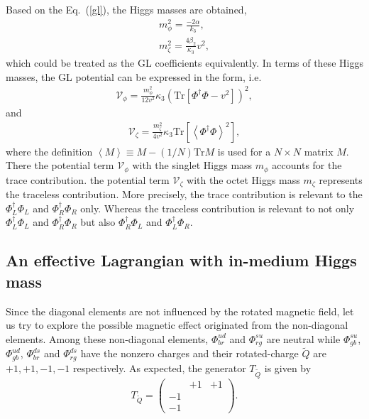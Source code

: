 \documentclass[prd, showpacs,nofootinbib,amsmath,amssymb]{revtex4}
\begin{document}
Based on the Eq.~(\ref{gl}), the Higgs
masses are obtained,
\begin{eqnarray}
m_\phi^2=\frac{-2\alpha}{k_3},\\ m_\zeta^2=\frac{4\beta_2}{\kappa_3}
	v^2,\label{mhiggs}
\end{eqnarray}
which could be treated as the GL coefficients equivalently. In terms of these Higgs masses, the GL
potential can be expressed in the form, i.e.
\begin{eqnarray}
\mathcal{V}_\phi=
\frac{m_\phi^2}{12v^2}\kappa_3(\text{Tr}[\Phi^\dagger\Phi-v^2])^2,
\label{glmphi}
\end{eqnarray}
and
\begin{eqnarray}
\mathcal{V}_\zeta=
\frac{m_\zeta^2}{4v^2}\kappa_3\text{Tr}\left[\left<\Phi^\dagger\Phi\right>^2\right],
\label{glzeta}
\end{eqnarray}
where the definition $\left<M\right>\equiv M-(1/N)\text{Tr}M$ is used for a $N\times N$ matrix $M$.
There the potential term $\mathcal{V}_\phi$ with the singlet Higgs mass $m_{\phi}$ accounts for the trace contribution.
the potential term $\mathcal{V}_\zeta$ with the octet Higgs mass $m_{\zeta}$ represents the traceless contribution.
More precisely, the trace contribution is relevant to the $\Phi_L^\dagger\Phi_L$ and $\Phi_R^\dagger\Phi_R$ only.
Whereas the traceless contribution is relevant to not only $\Phi_L^\dagger\Phi_L$ and $\Phi_R^\dagger\Phi_R$ 
but also $\Phi_R^\dagger\Phi_L$ and $\Phi_L^\dagger\Phi_R$.








\subsection{An effective Lagrangian with in-medium Higgs mass}
\label{sssec:2}

Since the diagonal elements are not influenced by the rotated magnetic field,
let us try to explore the possible magnetic effect originated from the non-diagonal elements.
Among these non-diagonal
elements, $\Phi_{br}^{ud}$ and $\Phi_{rg}^{su}$ are neutral while $\Phi_{gb}^{su}$, $\Phi_{gb}^{ud}$, $\Phi_{br}^{ds}$ and $\Phi_{rg}^{ds}$ have the
nonzero charges and their  rotated-charge $\widetilde{Q}$ are $+1,+1,-1,-1$  respectively.
As expected, the generator $T_{\widetilde{Q}}$ is given by 
\begin{equation}
T_{\widetilde{Q}} = \begin{pmatrix}
            &    +1  & +1\\
    -1 &            &      \\
    -1 &            &
\end{pmatrix}.
\end{equation}
\end{document}
